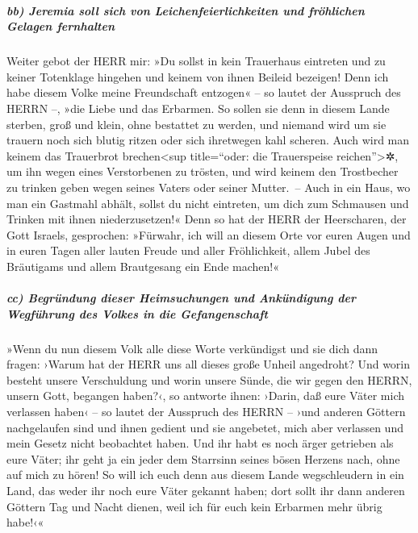 \hypertarget{bb-jeremia-soll-sich-von-leichenfeierlichkeiten-und-fruxf6hlichen-gelagen-fernhalten}{%
\subparagraph{bb) Jeremia soll sich von Leichenfeierlichkeiten und
fröhlichen Gelagen
fernhalten}\label{bb-jeremia-soll-sich-von-leichenfeierlichkeiten-und-fruxf6hlichen-gelagen-fernhalten}}

Weiter gebot der HERR mir: »Du sollst in kein Trauerhaus
eintreten und zu keiner Totenklage hingehen und keinem von ihnen Beileid
bezeigen! Denn ich habe diesem Volke meine Freundschaft entzogen« -- so
lautet der Ausspruch des HERRN --, »die Liebe und das Erbarmen.
So sollen sie denn in diesem Lande sterben, groß und
klein, ohne bestattet zu werden, und niemand wird um sie trauern noch
sich blutig ritzen oder sich ihretwegen kahl scheren. Auch
wird man keinem das Trauerbrot brechen\textless sup title=``oder: die
Trauerspeise reichen''\textgreater✲, um ihn wegen eines Verstorbenen zu
trösten, und wird keinem den Trostbecher zu trinken geben wegen seines
Vaters oder seiner Mutter.~-- Auch in ein Haus, wo man ein
Gastmahl abhält, sollst du nicht eintreten, um dich zum Schmausen und
Trinken mit ihnen niederzusetzen!« Denn so hat der HERR
der Heerscharen, der Gott Israels, gesprochen: »Fürwahr, ich will an
diesem Orte vor euren Augen und in euren Tagen aller lauten Freude und
aller Fröhlichkeit, allem Jubel des Bräutigams und allem Brautgesang ein
Ende machen!«

\hypertarget{cc-begruxfcndung-dieser-heimsuchungen-und-ankuxfcndigung-der-wegfuxfchrung-des-volkes-in-die-gefangenschaft}{%
\subparagraph{cc) Begründung dieser Heimsuchungen und Ankündigung der
Wegführung des Volkes in die
Gefangenschaft}\label{cc-begruxfcndung-dieser-heimsuchungen-und-ankuxfcndigung-der-wegfuxfchrung-des-volkes-in-die-gefangenschaft}}

»Wenn du nun diesem Volk alle diese Worte verkündigst und
sie dich dann fragen: ›Warum hat der HERR uns all dieses große Unheil
angedroht? Und worin besteht unsere Verschuldung und worin unsere Sünde,
die wir gegen den HERRN, unsern Gott, begangen haben?‹,
so antworte ihnen: ›Darin, daß eure Väter mich verlassen
haben‹ -- so lautet der Ausspruch des HERRN -- ›und anderen Göttern
nachgelaufen sind und ihnen gedient und sie angebetet, mich aber
verlassen und mein Gesetz nicht beobachtet haben. Und ihr
habt es noch ärger getrieben als eure Väter; ihr geht ja ein jeder dem
Starrsinn seines bösen Herzens nach, ohne auf mich zu hören!
So will ich euch denn aus diesem Lande wegschleudern in
ein Land, das weder ihr noch eure Väter gekannt haben; dort sollt ihr
dann anderen Göttern Tag und Nacht dienen, weil ich für euch kein
Erbarmen mehr übrig habe!‹«

